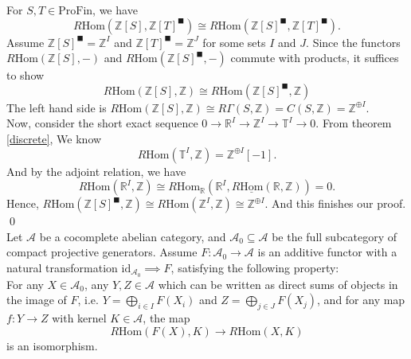 \documentclass[UTF8,12,a4paper]{ctexart}
\theoremstyle{definition}
\begin{document}
\prop 
For $S, T\in\text{ProFin}$, we have
$$
R\text{Hom}(\mathbb{Z}[S],\mathbb{Z}[T]^{\blacksquare})\cong R\text{Hom}(\mathbb{Z}[S]^{\blacksquare},\mathbb{Z}[T]^{\blacksquare}).
$$
\pf
Assume $\mathbb{Z}[S]^{\blacksquare}=\mathbb{Z}^I$ and $\mathbb{Z}[T]^{\blacksquare}=\mathbb{Z}^J$ for some sets $I$ and $J$. Since the functors $R\text{Hom}(\mathbb{Z}[S],-)$ and $R\text{Hom}(\mathbb{Z}[S]^{\blacksquare},-)$ commute with products, it suffices to show 
$$
R\text{Hom}(\mathbb{Z}[S],\mathbb{Z})\cong R\text{Hom}(\mathbb{Z}[S]^{\blacksquare},\mathbb{Z})
$$
The left hand side is $R\text{Hom}(\mathbb{Z}[S],\mathbb{Z})\cong R\Gamma(S,\mathbb{Z})=C(S,\mathbb{Z})=\mathbb{Z}^{\oplus I}.$\\
Now, consider the short exact sequence $0\rightarrow \mathbb{R}^I\rightarrow \mathbb{Z}^I\rightarrow \mathbb{T}^I\rightarrow 0.$ From theorem \ref{discrete}, We know $$R\text{Hom}(\mathbb{T}^I,\mathbb{Z})=\mathbb{Z}^{\oplus I}[-1].$$
 And by the adjoint relation, we have
 $$
 R\text{Hom}(\mathbb{R}^I,\mathbb{Z})\cong R\text{Hom}_{\mathbb{R}}(\mathbb{R}^I,R\underline{\text{Hom}}(\mathbb{R},\mathbb{Z}))=0.
 $$
 Hence, $R\text{Hom}(\mathbb{Z}[S]^{\blacksquare},\mathbb{Z})\cong R\text{Hom}(\mathbb{Z}^I,\mathbb{Z})\cong\mathbb{Z}^{\oplus I}.$ And this finishes our proof.
\qed
\\
\lem 
Let $\mathcal{A}$ be a cocomplete abelian category, and $\mathcal{A}_0\subseteq \mathcal{A}$ be the full subcategory of compact projective generators. Assume $F:\mathcal{A}_0\rightarrow \mathcal{A}$ is an additive functor with a natural transformation $\mathrm{id}_{\mathcal{A}_0}\implies F$, satisfying the following property:
~\\

For any $X\in\mathcal{A}_0$, any $Y, Z\in\mathcal{A}$ which can be written as direct sums of objects in the image of $F$, i.e. $Y=\bigoplus_{i\in I} F(X_i) $ and $Z=\bigoplus_{j\in J} F(X_j)$, and for any map $f:Y\rightarrow Z$ with kernel $K\in\mathcal{A}$, the map
$$
R\text{Hom}(F(X),K)\rightarrow R\text{Hom}(X,K)
$$
is an isomorphism.
~\\
\end{document}
